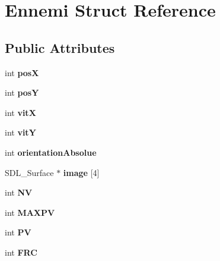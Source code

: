 \hypertarget{structEnnemi}{}\section{Ennemi Struct Reference}
\label{structEnnemi}
\subsection*{Public Attributes}
\begin{DoxyCompactItemize}
\item 
\mbox{\label{structEnnemi_a35f8ccdd3a0f0c3faca7b4da7ff22766}} 
int {\bfseries posX}
\item 
\mbox{\label{structEnnemi_ac58244b7ed33885002d35b28663b309c}} 
int {\bfseries posY}
\item 
\mbox{\label{structEnnemi_a564dc9e38ffb9d9ca7588c23cc4c691a}} 
int {\bfseries vitX}
\item 
\mbox{\label{structEnnemi_aeaceaa7816f3385c5818dcdae72964a6}} 
int {\bfseries vitY}
\item 
\mbox{\label{structEnnemi_a2e8699941d4f9aaddd78953a4aca86a9}} 
int {\bfseries orientation\+Absolue}
\item 
\mbox{\label{structEnnemi_a88b0f4d52e7ad8f434ebefb58e592134}} 
S\+D\+L\+\_\+\+Surface $\ast$ {\bfseries image} \mbox{[}4\mbox{]}
\item 
\mbox{\label{structEnnemi_a2dc3f222ad11ce3c44fa02c4c1c756e2}} 
int {\bfseries NV}
\item 
\mbox{\label{structEnnemi_a576834ad3230bff735a823fea2b54b38}} 
int {\bfseries M\+A\+X\+PV}
\item 
\mbox{\label{structEnnemi_a152444c35d3a2e706c5154df7d2b962f}} 
int {\bfseries PV}
\item 
\mbox{\label{structEnnemi_a08d4d98b19e2c5e5405cd6f2b8a67fc8}} 
int {\bfseries F\+RC}
\item 
\mbox{\label{structEnnemi_a6d9009ef62945246a4e3d60606c81063}} 

\end{DoxyCompactItemize}
